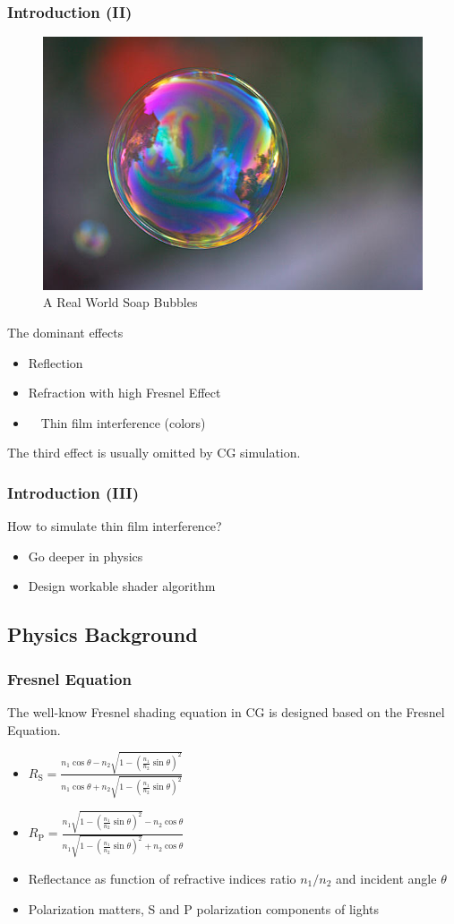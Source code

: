 \documentclass{beamer}
\begin{document}

\begin{frame}
	\frametitle{Introduction (II)}
	\begin{figure}
		\centering
		\includegraphics[width=0.3\linewidth]{real_world_bubble.jpg}
		\caption{A Real World Soap Bubbles}
	\end{figure}
	The dominant effects
	\begin{itemize}
		\item Reflection 
		\item Refraction with high Fresnel Effect
		\item　Thin film interference (colors)
	\end{itemize}
	The third effect is usually omitted by CG simulation.
\end{frame}


\begin{frame}
	\frametitle{Introduction (III)}
	How to simulate thin film interference?
	\begin{itemize}
		\item Go deeper in physics
		\item Design workable shader algorithm
	\end{itemize}
\end{frame}


\subsection{Physics Background}

\begin{frame}
	\frametitle{Fresnel Equation}
	The well-know Fresnel shading equation in CG is designed based on the Fresnel Equation.
	\begin{itemize}
		\item $R_{\textrm{S}} = \frac{n_1 \cos\theta - n_2\sqrt{1 - (\frac{n_1}{n_2}\sin\theta)^2}}{n_1 \cos\theta + n_2\sqrt{1 - (\frac{n_1}{n_2}\sin\theta)^2}}$
		\item $R_{\textrm{P}} = \frac{n_1\sqrt{1 - (\frac{n_1}{n_2}\sin\theta)^2} - n_2 \cos\theta}{n_1\sqrt{1 - (\frac{n_1}{n_2}\sin\theta)^2} + n_2 \cos\theta}$
		\item Reflectance as function of refractive indices ratio $n_1/n_2$ and incident angle $\theta$
		\item Polarization matters, \textrm{S} and \textrm{P} polarization components of lights
	\end{itemize}
\end{frame}
\end{document}
